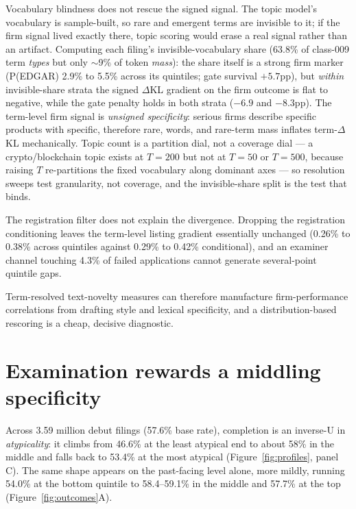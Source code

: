 \documentclass[11pt]{article}
\newcommand{\dkl}{$\Delta$KL}
\begin{document}
Vocabulary blindness does not rescue the signed signal. The topic
model's vocabulary is sample-built, so rare and emergent terms are
invisible to it; if the firm signal lived exactly there, topic scoring
would erase a real signal rather than an artifact. Computing each
filing's invisible-vocabulary share (63.8\% of class-009 term
\emph{types} but only $\sim$9\% of token \emph{mass}): the share itself
is a strong firm marker (P(EDGAR) 2.9\% to 5.5\% across its quintiles;
gate survival $+5.7$pp), but \emph{within} invisible-share strata the
signed \dkl{} gradient on the firm outcome is flat to negative, while
the gate penalty holds in both strata ($-6.9$ and $-8.3$pp). The
term-level firm signal is \emph{unsigned specificity}: serious firms
describe specific products with specific, therefore rare, words, and
rare-term mass inflates term-\dkl{} mechanically. Topic count is a
partition dial, not a coverage dial --- a crypto/blockchain topic exists
at $T = 200$ but not at $T = 50$ or $T = 500$, because raising $T$
re-partitions the fixed vocabulary along dominant axes --- so resolution
sweeps test granularity, not coverage, and the invisible-share split is
the test that binds.

The registration filter does not explain the divergence. Dropping the
registration conditioning leaves the term-level listing gradient
essentially unchanged (0.26\% to 0.38\% across quintiles against 0.29\%
to 0.42\% conditional), and an examiner channel touching 4.3\% of failed
applications cannot generate several-point quintile gaps.

Term-resolved text-novelty measures can therefore manufacture
firm-performance correlations from drafting style and lexical specificity,
and a distribution-based rescoring is a cheap, decisive diagnostic.

\section{Examination rewards a middling specificity}\label{app:registration}

Across 3.59 million debut filings (57.6\% base rate), completion is an
inverse-U in \emph{atypicality}: it climbs from 46.6\% at the least atypical
end to about 58\% in the middle and falls back to 53.4\% at the most atypical
(Figure~\ref{fig:profiles}, panel C). The same shape appears on the
past-facing level alone, more mildly, running 54.0\% at the bottom quintile to
58.4--59.1\% in the middle and 57.7\% at the top (Figure~\ref{fig:outcomes}A).
\end{document}
